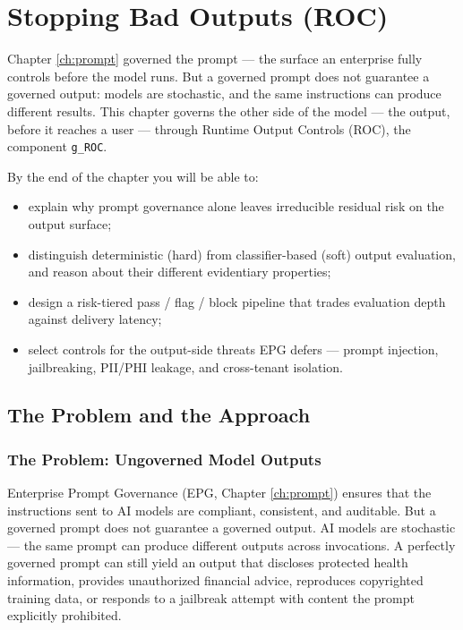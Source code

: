 \chapter{Stopping Bad Outputs (ROC)}
\label{ch:controls}


Chapter \ref{ch:prompt} governed the prompt --- the surface an enterprise fully controls before the model runs. But a governed prompt does not guarantee a governed output: models are stochastic, and the same instructions can produce different results. This chapter governs the other side of the model --- the output, before it reaches a user --- through Runtime Output Controls (ROC), the component \texttt{g\_\allowbreak{}ROC}.

By the end of the chapter you will be able to:

\begin{itemize}
  \item explain why prompt governance alone leaves irreducible residual risk on the output surface;
  \item distinguish deterministic (hard) from classifier-based (soft) output evaluation, and reason about their different evidentiary properties;
  \item design a risk-tiered pass / flag / block pipeline that trades evaluation depth against delivery latency;
  \item select controls for the output-side threats EPG defers --- prompt injection, jailbreaking, PII/PHI leakage, and cross-tenant isolation.
\end{itemize}


\section{The Problem and the Approach}
\label{sec:controls-1}


\subsection{The Problem: Ungoverned Model Outputs}


Enterprise Prompt Governance (EPG, Chapter \ref{ch:prompt}) ensures that the instructions sent to AI models are compliant, consistent, and auditable. But a governed prompt does not guarantee a governed output. AI models are stochastic --- the same prompt can produce different outputs across invocations. A perfectly governed prompt can still yield an output that discloses protected health information, provides unauthorized financial advice, reproduces copyrighted training data, or responds to a jailbreak attempt with content the prompt explicitly prohibited.

